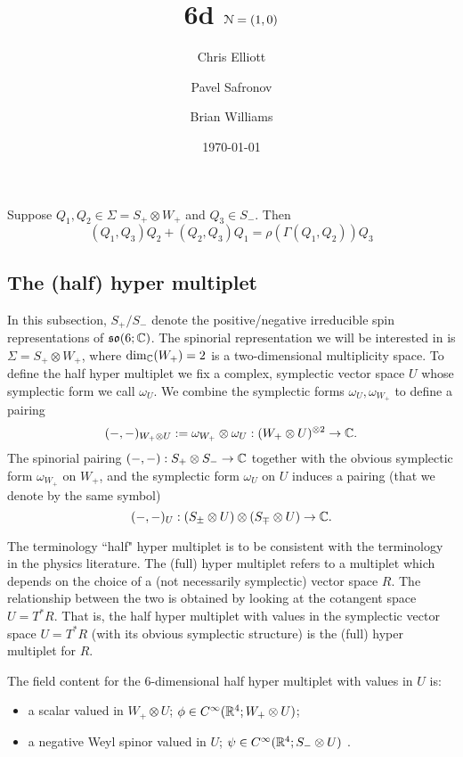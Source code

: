 \documentclass[10pt, oneside]{article}
\title{6d $\mathcal N=(1,0)$}
\author{Chris Elliott\and Pavel Safronov \and Brian Williams}
\date{\today}
\begin{document}
\maketitle


\begin{prop}\label{prop: new3psi}
Suppose $Q_1,Q_2 \in \Sigma = S_+ \otimes W_+$ and $Q_3 \in S_-$. 
Then
\[
(Q_1, Q_3) Q_2 + (Q_2, Q_3)Q_1 = \rho(\Gamma(Q_1,Q_2)) Q_3
\]
\end{prop}

\subsection{The (half) hyper multiplet}

In this subsection, $S_+ / S_-$ denote the positive/negative irreducible spin representations of $\mathfrak{so}(6; \mathbb C)$. 
The spinorial representation we will be interested in is $\Sigma = S_+ \otimes W_+$, where $\dim_{\mathbb C}(W_+) = 2$ is a two-dimensional multiplicity space. 
To define the half hyper multiplet we fix a complex, symplectic vector space $U$ whose symplectic form we call $\omega_U$.
We combine the symplectic forms $\omega_U, \omega_{W_+}$ to define a pairing 
\[
(-,-)_{W_+ \otimes U}  := \omega_{W_+} \otimes \omega_U : (W_+ \otimes U)^{\otimes 2} \to \mathbb C .
\]
The spinorial pairing $(-,-) : S_+ \otimes S_- \to \mathbb C$ together with the obvious symplectic form $\omega_{W_+}$ on $W_+$, and the symplectic form $\omega_U$ on $U$ induces a pairing (that we denote by the same symbol)
\[
(-,-)_U : (S_\pm \otimes U) \otimes (S_\mp \otimes U) \to \mathbb C .
\]

\begin{remark}
The terminology ``half" hyper multiplet is to be consistent with the terminology in the physics literature. 
The (full) hyper multiplet refers to a multiplet which depends on the choice of a (not necessarily symplectic) vector space $R$. 
The relationship between the two is obtained by looking at the cotangent space $U = T^*R$.
That is, the half hyper multiplet with values in the symplectic vector space $U = T^* R$ (with its obvious symplectic structure) is the (full) hyper multiplet for $R$. 
\end{remark}

The field content for the 6-dimensional half hyper multiplet with values in $U$ is:
\begin{itemize}
\item a scalar valued in $W_+ \otimes U$; $\phi \in C^\infty(\mathbb R^4 ; W_+ \otimes U)$;
\item a negative Weyl spinor valued in $U$; $\psi \in C^\infty(\mathbb R^4 ; S_- \otimes U)$ .
\end{itemize}
\end{document}
